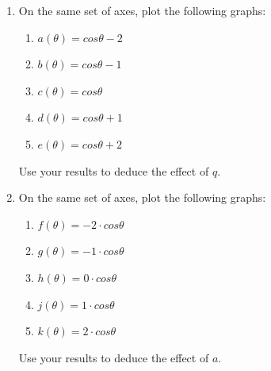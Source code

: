         \label{m39414*id87553}\begin{enumerate}[noitemsep, label=\textbf{\arabic*}. ] 
            \label{m39414*uid53}\item On the same set of axes, plot the following graphs:
\label{m39414*id87568}\begin{enumerate}[noitemsep, label=\textbf{\alph*}. ] 
            \label{m39414*uid54}\item \begin{math}a\left(\theta \right)=cos\theta -2\end{math}\label{m39414*uid55}\item \begin{math}b\left(\theta \right)=cos\theta -1\end{math}\label{m39414*uid56}\item \begin{math}c\left(\theta \right)=cos\theta \end{math}\label{m39414*uid57}\item \begin{math}d\left(\theta \right)=cos\theta +1\end{math}\label{m39414*uid58}\item \begin{math}e\left(\theta \right)=cos\theta +2\end{math}\end{enumerate}
        
Use your results to deduce the effect of \begin{math}q\end{math}.
\label{m39414*uid59}\item On the same set of axes, plot the following graphs:
\label{m39414*id87790}\begin{enumerate}[noitemsep, label=\textbf{\alph*}. ] 
            \label{m39414*uid60}\item \begin{math}f\left(\theta \right)=-2\ensuremath{\cdot}cos\theta \end{math}\label{m39414*uid61}\item \begin{math}g\left(\theta \right)=-1\ensuremath{\cdot}cos\theta \end{math}\label{m39414*uid62}\item \begin{math}h\left(\theta \right)=0\ensuremath{\cdot}cos\theta \end{math}\label{m39414*uid63}\item \begin{math}j\left(\theta \right)=1\ensuremath{\cdot}cos\theta \end{math}\label{m39414*uid64}\item \begin{math}k\left(\theta \right)=2\ensuremath{\cdot}cos\theta \end{math}\end{enumerate}
        
Use your results to deduce the effect of \begin{math}a\end{math}.
\end{enumerate}
        
